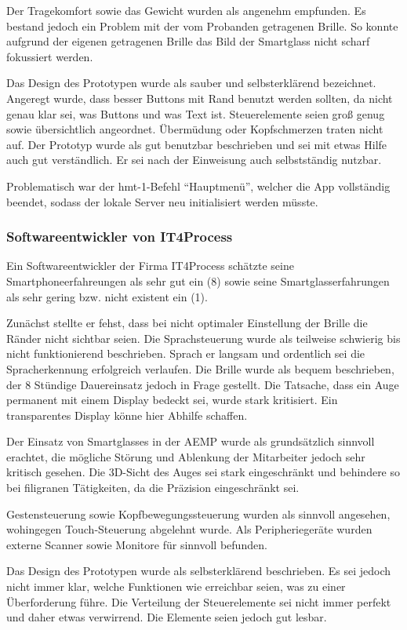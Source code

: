 Der Tragekomfort sowie das Gewicht wurden als angenehm empfunden. Es bestand jedoch ein Problem mit der vom Probanden getragenen Brille. So konnte aufgrund der eigenen getragenen Brille das Bild der Smartglass nicht scharf fokussiert werden.

Das Design des Prototypen wurde als sauber und selbsterklärend bezeichnet. Angeregt wurde, dass besser Buttons mit Rand benutzt werden sollten, da nicht genau klar sei, was Buttons und was Text ist. Steuerelemente seien groß genug sowie übersichtlich angeordnet. Übermüdung oder Kopfschmerzen traten nicht auf. Der Prototyp wurde als gut benutzbar beschrieben und sei mit etwas Hilfe auch gut verständlich. Er sei nach der Einweisung auch selbstständig nutzbar.

Problematisch war der hmt-1-Befehl \enquote{Hauptmenü}, welcher die App vollständig beendet, sodass der lokale Server neu initialisiert werden müsste.
%
%
\subsubsection{Softwareentwickler von IT4Process}
Ein Softwareentwickler der Firma IT4Process schätzte seine Smartphoneerfahreungen als sehr gut ein (8) sowie seine Smartglasserfahrungen als sehr gering bzw. nicht existent ein (1).

Zunächst stellte er fehst, dass bei nicht optimaler Einstellung der Brille die Ränder nicht sichtbar seien. Die Sprachsteuerung wurde als teilweise schwierig bis nicht funktionierend beschrieben. Sprach er langsam und ordentlich sei die Spracherkennung erfolgreich verlaufen. Die Brille wurde als bequem beschrieben, der 8 Stündige Dauereinsatz jedoch in Frage gestellt. Die Tatsache, dass ein Auge permanent mit einem Display bedeckt sei, wurde stark kritisiert. Ein transparentes Display könne hier Abhilfe schaffen.

Der Einsatz von Smartglasses in der AEMP wurde als grundsätzlich sinnvoll erachtet, die mögliche Störung und Ablenkung der Mitarbeiter jedoch sehr kritisch gesehen. Die 3D-Sicht des Auges sei stark eingeschränkt und behindere so bei filigranen Tätigkeiten, da die Präzision eingeschränkt sei.

Gestensteuerung sowie Kopfbewegungssteuerung wurden als sinnvoll angesehen, wohingegen Touch-Steuerung abgelehnt wurde. Als Peripheriegeräte wurden externe Scanner sowie Monitore für sinnvoll befunden.

Das Design des Prototypen wurde als selbsterklärend beschrieben. Es sei jedoch nicht immer klar, welche Funktionen wie erreichbar seien, was zu einer Überforderung führe. Die Verteilung der Steuerelemente sei nicht immer perfekt und daher etwas verwirrend. Die Elemente seien jedoch gut lesbar.

